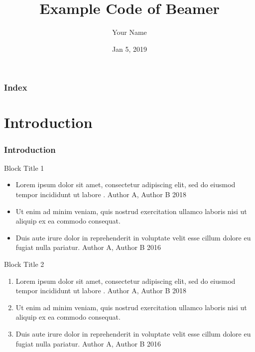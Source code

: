 

\title{Example Code of Beamer} %
\author[Your Name]{Your Name} %
\date{Jan 5, 2019} %


\everymath{\displaystyle}

\begin{frame}
    \titlepage %
\end{frame}

\begin{frame}
    \frametitle{\textbf{Index}}
    \tableofcontents %
\end{frame}

\section{Introduction}\label{sec:introduction}
\begin{frame}
\frametitle{\textbf{Introduction}}
\begin{block}{Block Title 1}
\begin{itemize}
    \item Lorem ipsum dolor sit amet, consectetur adipiscing elit, sed do eiusmod tempor incididunt ut labore . {\scriptsize \color{red} Author A, Author B 2018 }
    \item Ut enim ad minim veniam, quis nostrud exercitation ullamco laboris nisi ut aliquip ex ea commodo consequat.
    \item Duis aute irure dolor in reprehenderit in voluptate velit esse cillum dolore eu fugiat nulla pariatur.  {\scriptsize \color{red} Author A, Author B 2016 }
\end{itemize}
\end{block}
    
\begin{exampleblock}{Block Title 2}
\begin{enumerate}
    \item Lorem ipsum dolor sit amet, consectetur adipiscing elit, sed do eiusmod tempor incididunt ut labore . {\scriptsize \color{red} Author A, Author B 2018 }
    \item Ut enim ad minim veniam, quis nostrud exercitation ullamco laboris nisi ut aliquip ex ea commodo consequat.
    \item Duis aute irure dolor in reprehenderit in voluptate velit esse cillum dolore eu fugiat nulla pariatur.  {\scriptsize \color{red} Author A, Author B 2016 }
\end{enumerate}
\end{exampleblock}
\end{frame}


